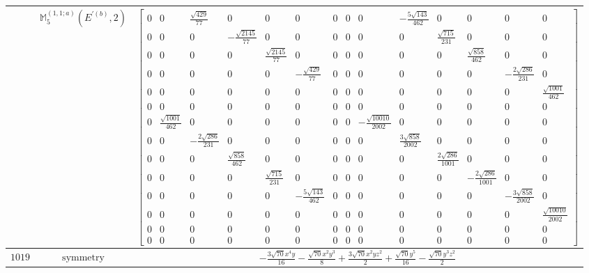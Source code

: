 \documentclass[fleqn,8pt,landscape]{jsarticle}
\begin{document}
\begin{longtable}{ccc}
$  $ & $ \mathbb{M}_{5}^{(1,1;a)}(E^{\prime(b)},2) $ & $ \begin{bmatrix} 0 & 0 & \frac{\sqrt{429}}{77} & 0 & 0 & 0 & 0 & 0 & 0 & - \frac{5 \sqrt{143}}{462} & 0 & 0 & 0 & 0 \\ 0 & 0 & 0 & - \frac{\sqrt{2145}}{77} & 0 & 0 & 0 & 0 & 0 & 0 & \frac{\sqrt{715}}{231} & 0 & 0 & 0 \\ 0 & 0 & 0 & 0 & \frac{\sqrt{2145}}{77} & 0 & 0 & 0 & 0 & 0 & 0 & \frac{\sqrt{858}}{462} & 0 & 0 \\ 0 & 0 & 0 & 0 & 0 & - \frac{\sqrt{429}}{77} & 0 & 0 & 0 & 0 & 0 & 0 & - \frac{2 \sqrt{286}}{231} & 0 \\ 0 & 0 & 0 & 0 & 0 & 0 & 0 & 0 & 0 & 0 & 0 & 0 & 0 & \frac{\sqrt{1001}}{462} \\ 0 & 0 & 0 & 0 & 0 & 0 & 0 & 0 & 0 & 0 & 0 & 0 & 0 & 0 \\ 0 & \frac{\sqrt{1001}}{462} & 0 & 0 & 0 & 0 & 0 & 0 & - \frac{\sqrt{10010}}{2002} & 0 & 0 & 0 & 0 & 0 \\ 0 & 0 & - \frac{2 \sqrt{286}}{231} & 0 & 0 & 0 & 0 & 0 & 0 & \frac{3 \sqrt{858}}{2002} & 0 & 0 & 0 & 0 \\ 0 & 0 & 0 & \frac{\sqrt{858}}{462} & 0 & 0 & 0 & 0 & 0 & 0 & \frac{2 \sqrt{286}}{1001} & 0 & 0 & 0 \\ 0 & 0 & 0 & 0 & \frac{\sqrt{715}}{231} & 0 & 0 & 0 & 0 & 0 & 0 & - \frac{2 \sqrt{286}}{1001} & 0 & 0 \\ 0 & 0 & 0 & 0 & 0 & - \frac{5 \sqrt{143}}{462} & 0 & 0 & 0 & 0 & 0 & 0 & - \frac{3 \sqrt{858}}{2002} & 0 \\ 0 & 0 & 0 & 0 & 0 & 0 & 0 & 0 & 0 & 0 & 0 & 0 & 0 & \frac{\sqrt{10010}}{2002} \\ 0 & 0 & 0 & 0 & 0 & 0 & 0 & 0 & 0 & 0 & 0 & 0 & 0 & 0 \\ 0 & 0 & 0 & 0 & 0 & 0 & 0 & 0 & 0 & 0 & 0 & 0 & 0 & 0 \end{bmatrix} $ \\ \hline
$ 1019 $ & $ \text{symmetry} $ & $ - \frac{3 \sqrt{70} x^{4} y}{16} - \frac{\sqrt{70} x^{2} y^{3}}{8} + \frac{3 \sqrt{70} x^{2} y z^{2}}{2} + \frac{\sqrt{70} y^{5}}{16} - \frac{\sqrt{70} y^{3} z^{2}}{2} $ \\

\end{longtable}
\end{document}
